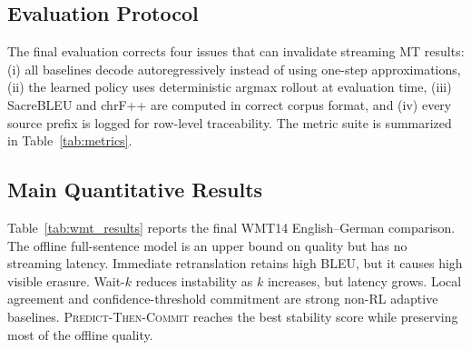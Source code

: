 \documentclass[conference]{IEEEtran}
\begin{document}
\subsection{Evaluation Protocol}
The final evaluation corrects four issues that can invalidate streaming MT results: (i) all baselines decode autoregressively instead of using one-step approximations, (ii) the learned policy uses deterministic argmax rollout at evaluation time, (iii) SacreBLEU and chrF++ are computed in correct corpus format, and (iv) every source prefix is logged for row-level traceability. The metric suite is summarized in Table~\ref{tab:metrics}.

\begin{table}[t]
\centering
\caption{Final metric suite.}
\label{tab:metrics}
\end{table}

\subsection{Main Quantitative Results}
Table~\ref{tab:wmt_results} reports the final WMT14 English--German comparison. The offline full-sentence model is an upper bound on quality but has no streaming latency. Immediate retranslation retains high BLEU, but it causes high visible erasure. Wait-$k$ reduces instability as $k$ increases, but latency grows. Local agreement and confidence-threshold commitment are strong non-RL adaptive baselines. \textsc{Predict-Then-Commit} reaches the best stability score while preserving most of the offline quality.
\end{document}
